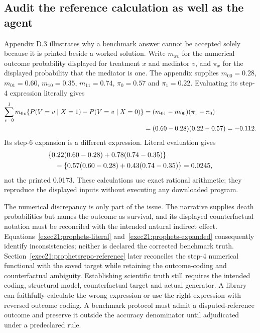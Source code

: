 \subsection{Audit the reference calculation as well as the agent}
\label{exec21:prophets-arithmetic}
Appendix D.3 illustrates why a benchmark answer cannot be accepted solely because
it is printed beside a worked solution. Write $m_{xv}$ for the numerical outcome
probability displayed for treatment $x$ and mediator $v$, and $\pi_x$ for the
displayed probability that the mediator is one. The appendix supplies
$m_{00}=0.28$, $m_{01}=0.60$, $m_{10}=0.35$, $m_{11}=0.74$,
$\pi_0=0.57$ and $\pi_1=0.22$. Evaluating its step-4 expression literally gives
\begin{align}
 \sum_{v=0}^1 m_{0v}
 \{P(V=v\mid X=1)-P(V=v\mid X=0)\}
 &=(m_{01}-m_{00})(\pi_1-\pi_0)\notag\\
 &=(0.60-0.28)(0.22-0.57)=-0.112.
 \label{exec21:prophets-literal}
\end{align}
Its step-6 expansion is a different expression. Literal evaluation gives
\begin{align}
 &\{0.22(0.60-0.28)+0.78(0.74-0.35)\}\notag\\
 &\quad-\{0.57(0.60-0.28)+0.43(0.74-0.35)\}
 =0.0245,
 \label{exec21:prophets-expanded}
\end{align}
not the printed 0.0173. These calculations use exact rational arithmetic;
they reproduce the displayed inputs without executing any downloaded program.
\citep{exec21_prophets,exec21_prophets_reference}

The numerical discrepancy is only part of the issue. The narrative supplies
death probabilities but names the outcome as survival, and its displayed
counterfactual notation must be reconciled with the intended natural indirect
effect. Equations~\eqref{exec21:prophets-literal}
and~\eqref{exec21:prophets-expanded} consequently identify inconsistencies;
neither is declared the corrected benchmark truth. Section~\ref{exec21:prophetsrepo-reference} later reconciles the step-4 numerical functional with the saved target while retaining the outcome-coding and counterfactual ambiguity. Establishing scientific truth still requires the intended coding, structural model, counterfactual target and actual generator. A library can faithfully calculate the wrong expression or
use the right expression with reversed outcome coding. A benchmark protocol
must admit a disputed-reference outcome and preserve it outside the accuracy
denominator until adjudicated under a predeclared rule.


